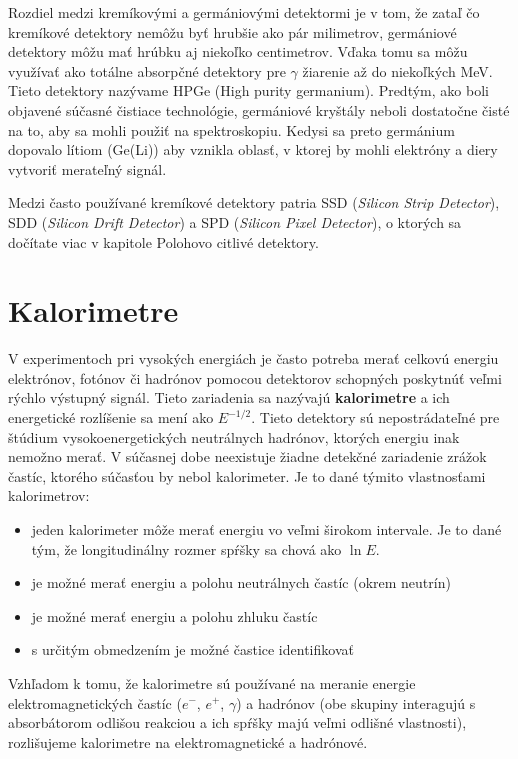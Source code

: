 \documentclass[../../main.tex]{subfiles}
\begin{document}
Rozdiel medzi kremíkovými a germániovými detektormi je v tom, že zataľ čo kremíkové detektory nemôžu byť hrubšie ako pár milimetrov, germániové detektory môžu mať hrúbku aj niekoľko centimetrov. Vďaka tomu sa môžu využívať ako totálne absorpčné detektory pre $\gamma$ žiarenie až do niekoľkých MeV. Tieto detektory nazývame HPGe (High purity germanium). Predtým, ako boli objavené súčasné čistiace technológie, germániové kryštály neboli dostatočne čisté na to, aby sa mohli použiť na spektroskopiu. Kedysi sa preto germánium dopovalo lítiom (Ge(Li)) aby vznikla oblasť, v ktorej by mohli elektróny a diery vytvoriť merateľný signál.

Medzi často používané kremíkové detektory patria SSD (\textit{Silicon Strip Detector}), SDD (\textit{Silicon Drift Detector}) a SPD (\textit{Silicon Pixel Detector}), o ktorých sa dočítate viac v kapitole Polohovo citlivé detektory.


\section{Kalorimetre}

V experimentoch pri vysokých energiách je často potreba merať celkovú energiu elektrónov, fotónov či hadrónov pomocou detektorov schopných poskytnúť veľmi rýchlo výstupný signál. Tieto zariadenia sa nazývajú \textbf{kalorimetre} a ich energetické rozlíšenie sa mení ako $E^{-1/2}$. Tieto detektory sú nepostrádateľné pre štúdium vysokoenergetických neutrálnych hadrónov, ktorých energiu inak nemožno merať. V súčasnej dobe neexistuje žiadne detekčné zariadenie zrážok častíc, ktorého súčasťou by nebol kalorimeter. Je to dané týmito vlastnosťami kalorimetrov:
\begin{itemize}
\item jeden kalorimeter môže merať energiu vo veľmi širokom intervale. Je to dané tým, že longitudinálny rozmer spŕšky sa chová ako $\ln E$.
\item je možné merať energiu a polohu neutrálnych častíc (okrem neutrín)
\item je možné merať energiu a polohu zhluku častíc
\item s určitým obmedzením je možné častice identifikovať
\end{itemize}

Vzhľadom k tomu, že kalorimetre sú používané na meranie energie elektromagnetických častíc ($e^-$, $e^+$, $\gamma$) a hadrónov (obe skupiny interagujú s absorbátorom odlišou reakciou a ich spŕšky majú veľmi odlišné vlastnosti), rozlišujeme kalorimetre na elektromagnetické a hadrónové.
\end{document}
